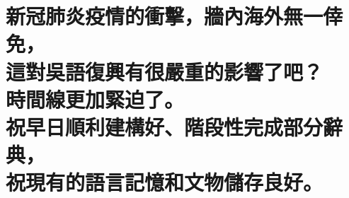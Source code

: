 %
% 

\chapter[新冠肺炎疫情的衝擊，牆內海外無一倖免， 這對吳語復興有很嚴重的影響了吧？ 時間線更加緊迫了。 祝早日順利建構好、階段性完成部分辭典， 祝現有的語言記憶和文物儲存良好。]{新冠肺炎疫情的衝擊，牆內海外無一倖免， \\[0.35em] 這對吳語復興有很嚴重的影響了吧？ \\[0.35em] 時間線更加緊迫了。 \\[0.35em] 祝早日順利建構好、階段性完成部分辭典， \\[0.35em] 祝現有的語言記憶和文物儲存良好。}

